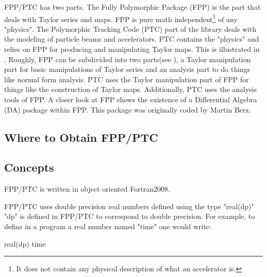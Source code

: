 \documentclass[english,12pt,article]{article} %
\begin{document}
FPP/PTC has two parts. The Fully Polymorphic Package (FPP) is the part that deals with Taylor series and maps. FPP is pure math independent\footnote{It does not contain any physical description of what an accelerator is. } of any "physics". The Polymorphic Tracking Code (PTC) part of the library deals with the modeling of particle beams and accelerators. PTC contains the "physics" and relies on FPP for producing and manipulating Taylor maps. This is illustrated in . Roughly, FPP can be subdivided into two parts(see ), a Taylor manipulation part for basic manipulations of Taylor series and an analysis part to do things like normal form analysis. PTC uses the Taylor manipulation part of FPP for things like the construction of Taylor maps. Additionally, PTC uses the analysis tools of FPP. A closer look at FPP shows the existence of a Differential Algebra (DA) package within FPP. This package was originally coded by Martin Berz.

\subsection{Where to Obtain FPP/PTC}

\subsection{Concepts}

FPP/PTC is written in object oriented Fortran2008. 

FPP/PTC uses double precision real numbers defined using the type "real(dp)" "dp" is defined in FPP/PTC to correspond to double precision. For example, to define in a program a real number named "time" one would write:
\begin{example}
  real(dp) time
\end{example}
\end{document}
